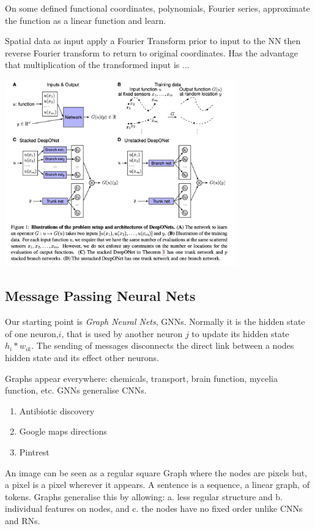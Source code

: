 On some defined functional coordinates, polynomials, Fourier series, approximate the function as a linear function and learn.

Spatial data as input apply a Fourier Transform prior to input to the NN then reverse Fourier transform to return to original coordinates. Has the advantage that multiplication of the transformed input is ...

\begin{center}
\includegraphics[width=100mm]{DeepONets.jpg}
\end{center}

\subsection{Message Passing Neural Nets}
Our starting point is \emph{Graph Neural Nets}, GNNs. Normally it is the hidden state of one neuron,$i$,  that is used  by another neuron $j$ to update its hidden state $h_i*w_{ik}$. The sending of messages disconnects the direct link between a nodes hidden state and its effect other neurons.


Graphs appear everywhere: chemicals, transport, brain function, mycelia function, etc. GNNs generalise CNNs.
\begin{enumerate}
\item  Antibiotic discovery
\item  Google maps directions
\item Pintrest
\end{enumerate}
An image can be seen as a regular square  Graph where the nodes are  pixels but, a pixel is a pixel wherever it appears. A sentence is a sequence, a linear graph, of tokens. 
Graphs generalise this by allowing: a. less regular structure and b. individual features on nodes, and c. the nodes have no fixed order unlike CNNs and RNs. 

